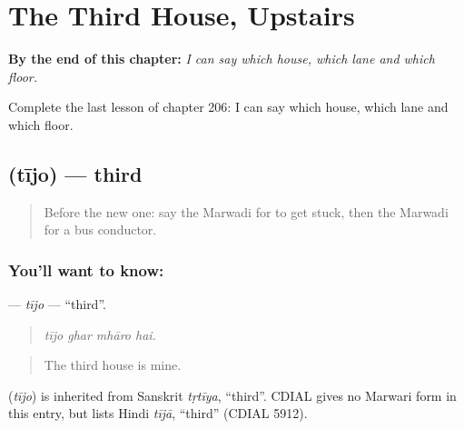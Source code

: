 
\chapter{The Third House, Upstairs}
\label{ch:mw-the-third-house-upstairs}

\begin{chapteropening}
\textbf{By the end of this chapter:} \emph{I can say which house, which lane and which floor.}

Complete the last lesson of chapter 206: I can say which house, which lane and which floor.
\end{chapteropening}

\section[\texorpdfstring{\mw{तीजो} (tījo)}{तीजो (tījo)}]{ (tījo) — third}

\label{lesson:MW-C206-tijo}



\begin{quote}
Before the new one: say the Marwadi for to get stuck, then the Marwadi for a bus conductor.
\end{quote}

\subsection*{You'll want to know: }
\textbf{} — \emph{tījo} — \textquotedblleft{}third\textquotedblright{}.

\begin{quote}
   
\end{quote}

\begin{quote}
\emph{tījo ghar mhāro hai.}
\end{quote}

\begin{quote}
The third house is mine.
\end{quote}

\begin{cousinweb}
\textbf{} (\emph{tījo}) is inherited from Sanskrit \emph{tṛtīya}, \textquotedblleft{}third\textquotedblright{}. CDIAL gives no Marwari form in this entry, but lists Hindi \emph{tījā}, \textquotedblleft{}third\textquotedblright{} (CDIAL 5912).
\end{cousinweb}

